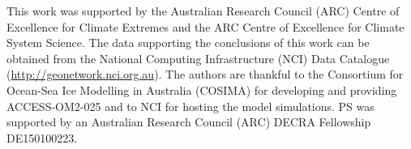 \documentclass[draft,linenumbers]{agujournal2018}
\begin{document}
\acknowledgments
This work was supported by the Australian Research Council (ARC) Centre of Excellence for Climate Extremes and the ARC Centre of Excellence for Climate System Science. The data supporting the conclusions of this work can be obtained from the National Computing Infrastructure (NCI) Data Catalogue (\url{http://geonetwork.nci.org.au}). The authors are thankful to the Consortium for Ocean-Sea Ice Modelling in Australia (COSIMA) for developing and providing ACCESS-OM2-025 and to NCI for hosting the model simulations. PS was supported by an Australian Research Council (ARC) DECRA Fellowship DE150100223.
 

\end{document}
